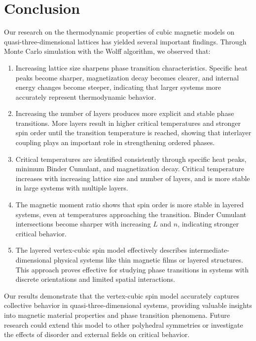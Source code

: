 \documentclass[conference, compsoc, twoside]{IEEEtran}
\begin{document}
\section{Conclusion}

Our research on the thermodynamic properties of cubic magnetic models on quasi-three-dimensional lattices has yielded several important findings. Through Monte Carlo simulation with the Wolff algorithm, we observed that:

\begin{enumerate}
\item Increasing lattice size sharpens phase transition characteristics. Specific heat peaks become sharper, magnetization decay becomes clearer, and internal energy changes become steeper, indicating that larger systems more accurately represent thermodynamic behavior.

\item Increasing the number of layers produces more explicit and stable phase transitions. More layers result in higher critical temperatures and stronger spin order until the transition temperature is reached, showing that interlayer coupling plays an important role in strengthening ordered phases.

\item Critical temperatures are identified consistently through specific heat peaks, minimum Binder Cumulant, and magnetization decay. Critical temperature increases with increasing lattice size and number of layers, and is more stable in large systems with multiple layers.

\item The magnetic moment ratio shows that spin order is more stable in layered systems, even at temperatures approaching the transition. Binder Cumulant intersections become sharper with increasing $L$ and $n$, indicating stronger critical behavior.

\item The layered vertex-cubic spin model effectively describes intermediate-dimensional physical systems like thin magnetic films or layered structures. This approach proves effective for studying phase transitions in systems with discrete orientations and limited spatial interactions.
\end{enumerate}

Our results demonstrate that the vertex-cubic spin model accurately captures collective behavior in quasi-three-dimensional systems, providing valuable insights into magnetic material properties and phase transition phenomena. Future research could extend this model to other polyhedral symmetries or investigate the effects of disorder and external fields on critical behavior.
\end{document}
